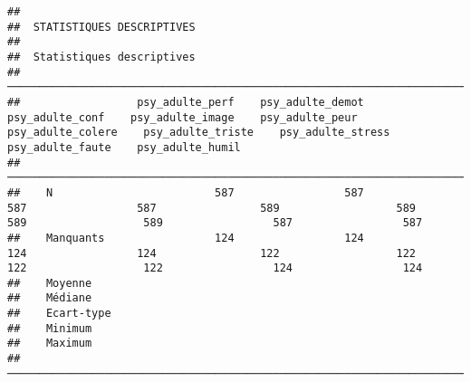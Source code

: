 \documentclass[
]{article}
\begin{document}
\begin{verbatim}
## 
##  STATISTIQUES DESCRIPTIVES
## 
##  Statistiques descriptives                                                                                                                                                                                              
##  ────────────────────────────────────────────────────────────────────────────────────────────────────────────────────────────────────────────────────────────────────────────────────────────────────────────────────── 
##                  psy_adulte_perf    psy_adulte_demot    psy_adulte_conf    psy_adulte_image    psy_adulte_peur    psy_adulte_colere    psy_adulte_triste    psy_adulte_stress    psy_adulte_faute    psy_adulte_humil   
##  ────────────────────────────────────────────────────────────────────────────────────────────────────────────────────────────────────────────────────────────────────────────────────────────────────────────────────── 
##    N                         587                 587                587                 587                589                  589                  589                  589                 587                 587   
##    Manquants                 124                 124                124                 124                122                  122                  122                  122                 124                 124   
##    Moyenne                                                                                                                                                                                                              
##    Médiane                                                                                                                                                                                                              
##    Ecart-type                                                                                                                                                                                                           
##    Minimum                                                                                                                                                                                                              
##    Maximum                                                                                                                                                                                                              
##  ────────────────────────────────────────────────────────────────────────────────────────────────────────────────────────────────────────────────────────────────────────────────────────────────────────────────────── 

\end{verbatim}
\end{document}
